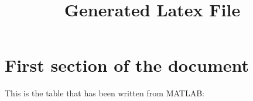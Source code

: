 \documentclass[10pt]{article}
\title{Generated Latex File}
\date{}
\begin{document}
\maketitle

\section{First section of the document}
This is the table that has been written from MATLAB:

\end{document}
